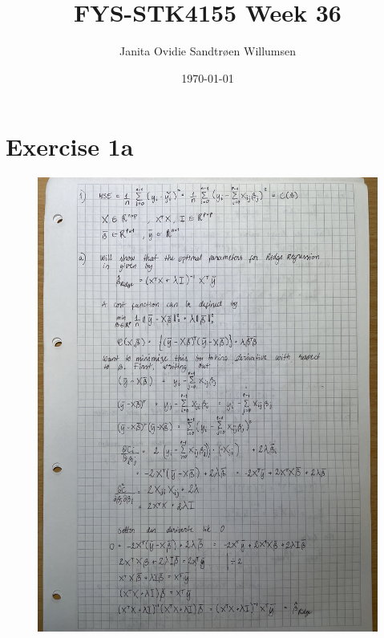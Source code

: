 \documentclass[english,notitlepage]{revtex4-1}  %
\begin{document}
\title{FYS-STK4155 Week 36}      %
\author{Janita Ovidie Sandtrøen Willumsen}          %
\date{\today}                             %
\noaffiliation                            %


\maketitle 
    
    
\section*{Exercise 1a}
\begin{figure}[H]
    \centering
    \includegraphics[angle=-90, width=\linewidth]{Week 36/36_1.jpg}
\end{figure}
\end{document}
